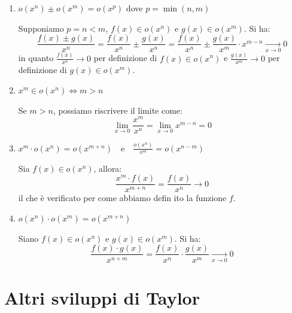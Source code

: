 \documentclass[12pt]{report}
\begin{document}
	\begin{enumerate}
		
		\item $o(x^n) \pm o(x^m) = o(x^p)$ dove $p = \min(n, m)$
		
		\begin{dimostrazione}{}{}
			
			Supponiamo $p = n < m$, $f(x) \in o(x^n)$ e $g(x) \in o(x^m)$. Si ha:
			\[
			\frac{f(x) \pm g(x)}{x^n} = \frac{f(x)}{x^n} \pm \frac{g(x)}{x^n} = \frac{f(x)}{x^n} \pm \frac{g(x)}{x^m} \cdot x^{m-n} \xrightarrow[x \to 0]{} 0
			\]
			in quanto $\frac{f(x)}{x^n} \to 0$ per definizione di $f(x) \in o(x^n)$ e $\frac{g(x)}{x^m} \to 0$ per definizione di $g(x) \in o(x^m)$.
			
		\end{dimostrazione}
		
		\item $x^m \in o(x^n) \iff m > n$
		
		\begin{dimostrazione}{}{}
			
			Se $m > n$, possiamo riscrivere il limite come:
			\[
			\lim_{x \to 0} \frac{x^m}{x^n} = \lim_{x \to 0} x^{m-n} = 0
			\]
			
		\end{dimostrazione}
		
		\item $x^m \cdot o(x^n) = o(x^{m+n}) \quad \text{e} \quad \frac{o(x^n)}{x^m} = o(x^{n-m})$
		
		\begin{dimostrazione}{}{}
			
			Sia $f(x) \in o(x^n)$, allora:
			\[
			\frac{x^m \cdot f(x)}{x^{m+n}} = \frac{f(x)}{x^n} \to 0
			\]
			il che è verificato per come abbiamo defin
			ito la funzione $f$.
		\end{dimostrazione}
		
		\item $o(x^n) \cdot o(x^m) = o(x^{m+n})$
		
		\begin{dimostrazione}{}{}
			
			Siano $f(x) \in o(x^n)$ e $g(x) \in o(x^m)$. Si ha:
			\[
			\frac{f(x) \cdot g(x)}{x^{n+m}} = \frac{f(x)}{x^n} \cdot \frac{g(x)}{x^m} \xrightarrow[x \to 0]{} 0
			\]
			
		\end{dimostrazione}
	\end{enumerate}
	
	\section{Altri sviluppi di Taylor}
	
\end{document}
